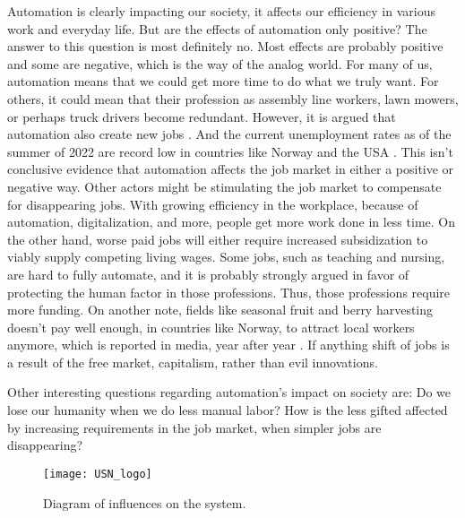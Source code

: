 \documentclass[%
oneside,    %
project,    %
nosummary   %
]{USN-MSc}
\begin{document}
Automation is clearly impacting our society, it affects our efficiency in various work and everyday life.
But are the effects of automation only positive? The answer to this question is most definitely no.
Most effects are probably positive and some are negative, which is the way of the analog world.
For many of us, automation means that we could get more time to do what we truly want.
For others, it could mean that their profession as assembly line workers, lawn mowers, or perhaps truck drivers become redundant.
However, it is argued that automation also create new jobs \cite{CERNETIC2002167}.
And the current unemployment rates as of the summer of 2022 are record low in countries like Norway \cite{Lavestea6:online} and the USA \cite{Theunemp77:online}.
This isn't conclusive evidence that automation affects the job market in either a positive or negative way.
Other actors might be stimulating the job market to compensate for disappearing jobs.
With growing efficiency in the workplace, because of automation, digitalization, and more, people get more work done in less time.
On the other hand, worse paid jobs will either require increased subsidization to viably supply competing living wages.
Some jobs, such as teaching and nursing, are hard to fully automate, and it is probably strongly argued in favor of protecting the human factor in those professions.
Thus, those professions require more funding. On another note, 
fields like seasonal fruit and berry harvesting doesn't pay well enough,
in countries like Norway, to attract local workers anymore, 
which is reported in media, year after year \cite{Toavtrej43:online}.
If anything shift of jobs is a result of the free market, capitalism, rather than evil innovations.

Other interesting questions regarding automation's impact on society are:
Do we lose our humanity when we do less manual labor?
How is the less gifted affected by increasing requirements in the job market, when simpler jobs are disappearing?



\begin{figure}[!ht]
   \centering
  \texttt{[image: USN\_logo]}
  \caption{Diagram of influences on the system.}
  \label{fig:diagramInfluences}
\end{figure}
\end{document}
